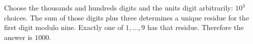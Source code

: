 Choose the thousands and hundreds digits and the units digit arbitrarily: $10^3$ choices. The sum of those digits plus three determines a unique residue for the first digit modulo nine. Exactly one of $1,\ldots,9$ has that residue. Therefore the answer is $\boxed{1000}$.
